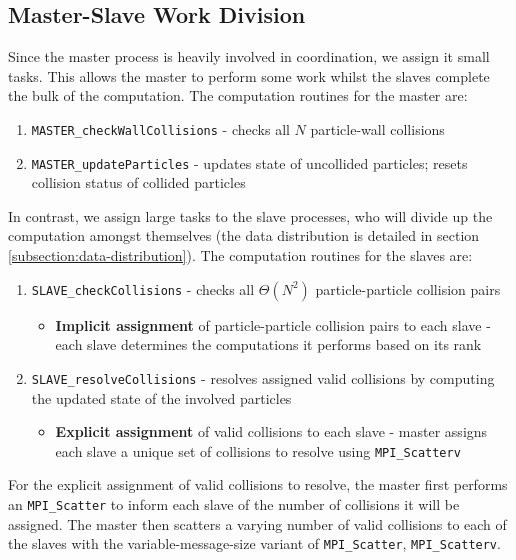 \documentclass[12pt]{article}
\begin{document}
\subsection{Master-Slave Work Division}
Since the master process is heavily involved in coordination, we assign it small tasks. This allows the master to perform some work whilst the slaves complete the bulk of the computation. The computation routines for the master are: 
\begin{enumerate}
    \item \texttt{MASTER\_checkWallCollisions} - checks all $N$ particle-wall collisions
    \item \texttt{MASTER\_updateParticles} - updates state of uncollided particles; resets collision status of collided particles
\end{enumerate}

In contrast, we assign large tasks to the slave processes, who will divide up the computation amongst themselves (the data distribution is detailed in section \ref{subsection:data-distribution}). The computation routines for the slaves are:
\begin{enumerate}
    \item \texttt{SLAVE\_checkCollisions} - checks all $\Theta(N^2)$ particle-particle collision pairs
    \begin{itemize}
        \item \textbf{Implicit assignment} of particle-particle collision pairs to each slave - each slave determines the computations it performs based on its rank 
    \end{itemize}
    \item \texttt{SLAVE\_resolveCollisions} - resolves assigned valid collisions by computing the updated state of the involved particles
    \begin{itemize}
        \item \textbf{Explicit assignment} of valid collisions to each slave - master assigns each slave a unique set of collisions to resolve using \texttt{MPI\_Scatterv}
    \end{itemize}
\end{enumerate}

For the explicit assignment of valid collisions to resolve, the master first performs an \texttt{MPI\_Scatter} to inform each slave of the number of collisions it will be assigned. The master then scatters a varying number of valid collisions to each of the slaves with the variable-message-size variant of \texttt{MPI\_Scatter}, \texttt{MPI\_Scatterv}.\\
\end{document}

